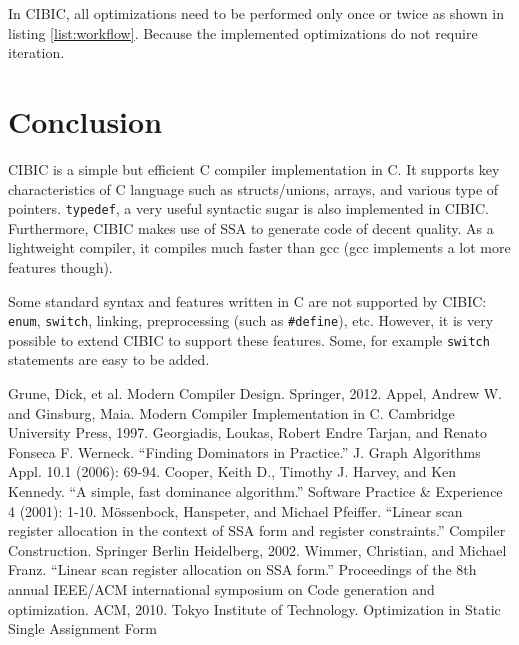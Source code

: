 \documentclass[10pt, a4paper]{article}
\begin{document}
In CIBIC, all optimizations need to be performed only once or twice as shown in
listing \ref{list:workflow}. Because the implemented optimizations do not
require iteration.

\section{Conclusion}
CIBIC is a simple but efficient C compiler implementation in C. It supports key
characteristics of C language such as structs/unions, arrays, and various type
of pointers. \texttt{typedef}, a very useful syntactic sugar is also
implemented in CIBIC. Furthermore, CIBIC makes use of SSA to generate code of
decent quality. As a lightweight compiler, it compiles much faster than gcc
(gcc implements a lot more features though).

Some standard syntax and features written in C are not supported by CIBIC:
\texttt{enum}, \texttt{switch}, linking, preprocessing (such as
\texttt{\#define}), etc. However, it is very possible to extend CIBIC to
support these features. Some, for example \texttt{switch} statements are easy
to be added.
\begin{thebibliography}{9}
        Grune, Dick, et al. Modern Compiler Design. Springer, 2012.
        Appel, Andrew W. and Ginsburg, Maia. Modern Compiler Implementation in
        C. Cambridge University Press, 1997.
        Georgiadis, Loukas, Robert Endre Tarjan, and Renato Fonseca F. Werneck.
        ``Finding Dominators in Practice.'' J. Graph Algorithms Appl. 10.1
        (2006): 69-94.
        Cooper, Keith D., Timothy J. Harvey, and Ken Kennedy. ``A simple, fast
        dominance algorithm.'' Software Practice \& Experience 4 (2001): 1-10.
        M\"ossenb\:ock, Hanspeter, and Michael Pfeiffer. ``Linear scan register
        allocation in the context of SSA form and register constraints.''
        Compiler Construction.  Springer Berlin Heidelberg, 2002.
        Wimmer, Christian, and Michael Franz. ``Linear scan register allocation
        on SSA form.'' Proceedings of the 8th annual IEEE/ACM international
        symposium on Code generation and optimization. ACM, 2010. 
        Tokyo Institute of Technology. Optimization in Static Single Assignment
        Form
\end{thebibliography}
\end{document}
